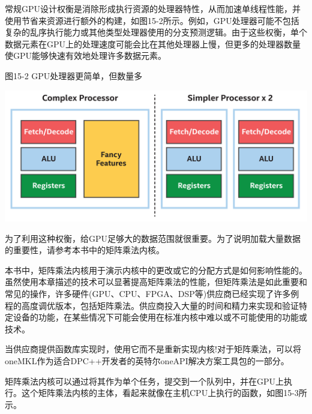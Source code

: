 常规GPU设计权衡是消除形成执行资源的处理器特性，从而加速单线程性能，并使用节省来资源进行额外的构建，如图15-2所示。例如，GPU处理器可能不包括复杂的乱序执行能力或其他类型处理器使用的分支预测逻辑。由于这些权衡，单个数据元素在GPU上的处理速度可能会比在其他处理器上慢，但更多的处理器数量使GPU能够快速有效地处理许多数据元素。\par

\hspace*{\fill} \par %
图15-2 GPU处理器更简单，但数量多
\begin{center}
	\includegraphics[width=1.0\textwidth]{content/chapter-15/images/3}
\end{center}

为了利用这种权衡，给GPU足够大的数据范围就很重要。为了说明加载大量数据的重要性，请参考本书中的矩阵乘法内核。\par

\begin{tcolorbox}[colback=blue!5!white,colframe=blue!75!black, title=关于矩阵乘法]
本书中，矩阵乘法内核用于演示内核中的更改或它的分配方式是如何影响性能的。虽然使用本章描述的技术可以显著提高矩阵乘法的性能，但矩阵乘法是如此重要和常见的操作，许多硬件(GPU、CPU、FPGA、DSP等)供应商已经实现了许多例程的高度调优版本，包括矩阵乘法。供应商投入大量的时间和精力来实现和验证特定设备的功能，在某些情况下可能会使用在标准内核中难以或不可能使用的功能或技术。
\end{tcolorbox}

\begin{tcolorbox}[colback=blue!5!white,colframe=blue!75!black, title=使用供应商提供的库!]
当供应商提供函数库实现时，使用它而不是重新实现内核!对于矩阵乘法，可以将oneMKL作为适合DPC++开发者的英特尔oneAPI解决方案工具包的一部分。
\end{tcolorbox}

矩阵乘法内核可以通过将其作为单个任务，提交到一个队列中，并在GPU上执行。这个矩阵乘法内核的主体，看起来就像在主机CPU上执行的函数，如图15-3所示。\par


